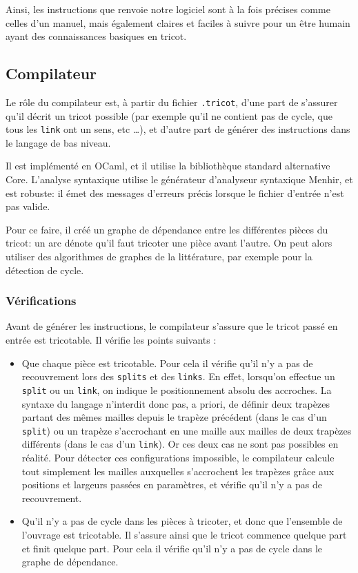 \documentclass{article}
\begin{document}

Ainsi, les instructions que renvoie notre logiciel sont à la fois précises comme celles d'un manuel, mais 
également claires et faciles à suivre pour un être humain ayant des connaissances basiques en tricot. 

\subsection{Compilateur} %

Le rôle du compilateur est, à partir du fichier \texttt{.tricot}, d'une part de 
s'assurer qu'il décrit un tricot possible (par exemple qu'il ne contient
pas de cycle, que tous les \texttt{link} ont un sens, etc \dots), et 
d'autre part de générer des instructions  dans le langage de bas niveau.

Il est implémenté en OCaml, et il utilise la bibliothèque standard alternative
Core. L'analyse syntaxique utilise le générateur d'analyseur syntaxique Menhir,
et est robuste: il émet des messages d'erreurs précis lorsque le fichier d'entrée 
n'est pas valide.

Pour ce faire, il créé un graphe de dépendance entre les différentes pièces
du tricot: un arc dénote qu'il faut tricoter une pièce avant l'autre. On peut
alors utiliser des algorithmes de graphes de la littérature, par exemple pour 
la détection de cycle.

\subsubsection{Vérifications}

Avant de générer les instructions, le compilateur s'assure que le tricot passé en entrée est tricotable. Il vérifie les points suivants :
\begin{itemize}
 \item Que chaque pièce est tricotable. Pour cela il vérifie qu'il n'y a pas de recouvrement lors des \texttt{splits} et des \texttt{links}. En effet, lorsqu'on effectue un \texttt{split} ou un \texttt{link}, on indique le positionnement absolu des accroches. La syntaxe du langage n'interdit donc pas, a priori, de définir deux trapèzes partant des mêmes mailles depuis le trapèze précédent (dans le cas d'un \texttt{split}) ou un trapèze s'accrochant en une maille aux mailles de deux trapèzes différents (dans le cas d'un \texttt{link}). Or ces deux cas ne sont pas possibles en réalité. Pour détecter ces configurations impossible, le compilateur calcule tout simplement les mailles auxquelles s'accrochent les trapèzes grâce aux positions et largeurs passées en paramètres, et vérifie qu'il n'y a pas de recouvrement.
 \item Qu'il n'y a pas de cycle dans les pièces à tricoter, et donc que l'ensemble de l'ouvrage est tricotable. Il s'assure ainsi que le tricot commence quelque part et finit quelque part. Pour cela il vérifie qu'il n'y a pas de cycle dans le graphe de dépendance.
\end{itemize}
\end{document}

